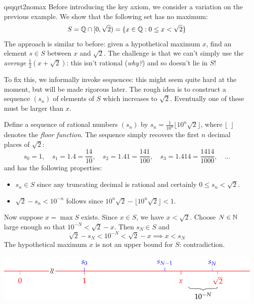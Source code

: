 \begin{example}{}{qsqqrt2nomax}
	Before introducing the key axiom, we consider a variation on the previous example. We show that the following set has no maximum:
	\[S=\mathbb{Q}\cap[0,\sqrt 2)=\{x\in \mathbb{Q}:0\le x<\sqrt 2\}\]	
	The approach is similar to before: given a hypothetical maximum $x$, find an element $s\in S$ between $x$ and $\sqrt 2$. The challenge is that we can't simply use the \emph{average} $\frac 12(x+\sqrt 2)$: this isn't rational (\emph{why?}) and so doesn't lie in $S$!\smallbreak
	
	To fix this, we informally invoke sequences: this might seem quite hard at the moment, but will be made rigorous later. The rough idea is to construct a sequence $(s_n)$ of elements of $S$ which increases to $\sqrt 2$. Eventually one of these must be larger than $x$.\smallbreak
	
	Define a sequence of rational numbers $(s_n)$ by $s_n=\frac 1{10^n}\lfloor 10^n\sqrt 2\rfloor$, where $\lfloor\ \ \rfloor$ denotes the \emph{floor function}.\footnotemark{} The sequence simply recovers the first $n$ decimal places of $\sqrt 2$:
	\[s_0=1,\quad s_1=1.4=\frac{14}{10},\quad s_2=1.41=\frac{141}{100},\quad s_3=1.414=\frac{1414}{1000},\quad\ldots\]
	and has the following properties:
	\begin{itemize}
	  \item $s_n\in S$ since any truncating decimal is rational and certainly $0\le s_n<\sqrt 2$.
	  \item $\sqrt 2-s_n< 10^{-n}$ follows since $10^n\sqrt 2-\lfloor 10^n\sqrt 2\rfloor< 1$.
	\end{itemize}
	Now suppose $x=\max S$ exists. Since $x\in S$, we have $x<\sqrt 2$. Choose $N\in \mathbb{N}$ large enough so that $10^{-N}<\sqrt 2-x$. Then $s_N\in S$ and
	\[\sqrt 2 -s_N<10^{-N}<\sqrt 2-x\implies x<s_N\]
	The hypothetical maximum $x$ is not an upper bound for $S$: contradiction.
	\begin{center}
	  \includegraphics{nomax2}\vspace{-5pt}
	\end{center}
\end{example}

\vspace{-10pt}

